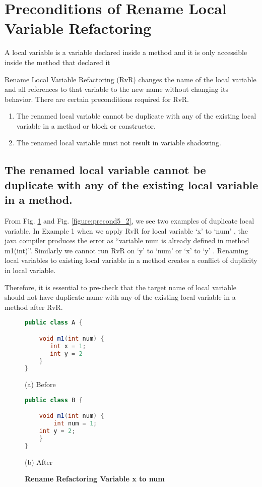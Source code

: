 \section{\textbf{Preconditions of Rename Local Variable Refactoring}}
A local variable is a variable declared inside a method and it is only accessible inside the method that declared it

Rename Local Variable Refactoring (RvR) changes the name of the local variable and all references to that variable to the new name without changing its behavior. There are certain preconditions required for RvR.
\begin{enumerate}
\item The renamed local variable cannot be duplicate with any of the existing local variable in a method or block or constructor.
\item The renamed local variable must not result in variable shadowing.
\end{enumerate}

\subsection{The renamed local variable cannot be duplicate with any of the existing local variable in a method.}
 
From Fig. \ref{figure:precond5_1} and Fig. \ref{figure:precond5_2}, we see two examples of duplicate local variable. In Example 1 when we apply RvR for local variable `x' to `num' , the java compiler produces the error as ``variable num is already defined in method m1(int)''. Similarly we cannot run RvR on  `y'  to `num' or `x'  to `y' . Renaming local variables to existing local variable in a method creates a conflict of duplicity in local variable.

Therefore, it is essential to pre-check that the target name of local variable should not have duplicate name with any of the existing local variable in a method after RvR.

\begin{figure}[th]
\centering
\begin{minipage}[t]{0.45\linewidth}
\begin{lstlisting}[language=java, basicstyle=\scriptsize\ttfamily,frame=single]
public class A {

    void m1(int num) {
       int x = 1; 
       int y = 2
    }
}
\end{lstlisting}
\centering(a) Before
\end{minipage}
\hfill
\begin{minipage}[t]{0.45\linewidth}
\begin{lstlisting}[language=java, basicstyle=\scriptsize\ttfamily,frame=single]
public class B {

    void m1(int num) {
        int num = 1; 
	int y = 2;
    }
}
\end{lstlisting}
\centering(b) After 
\end{minipage}
\caption{\textbf{Rename Refactoring Variable x to num}}
\label{figure:precond5_1}
\end{figure}

